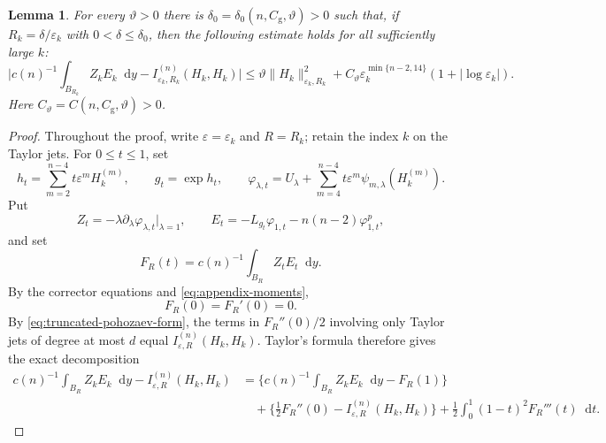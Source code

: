 \documentclass[11pt]{article}
\numberwithin{equation}{section}
\newtheorem{lemma}[theorem]{Lemma}
\theoremstyle{remark}
\newcommand{\dd}{\mathop{}\!\mathrm{d}}
\begin{document}
 \begin{lemma}\label{lem:actual-finite-comparison}
For every $\vartheta>0$ there is
$\delta_0=\delta_0(n,C_{\mathrm g},\vartheta)>0$ such that,
if $R_k=\delta/\varepsilon_k$ with
$0<\delta\le\delta_0$, then the following estimate holds for all
sufficiently large $k$:
\[
 \Bigg|c(n)^{-1}\int_{B_{R_k}}Z_kE_k\dd y
 -I_{\varepsilon_k,R_k}^{(n)}(H_k,H_k)\Bigg|
 \le\vartheta\|H_k\|_{\varepsilon_k,R_k}^2
 +C_\vartheta\varepsilon_k^{\min\{n-2,14\}}
 (1+|\log\varepsilon_k|).
\]
Here $C_\vartheta=C(n,C_{\mathrm g},\vartheta)>0$.
\end{lemma}

\begin{proof}
Throughout the proof, write $\varepsilon=\varepsilon_k$ and $R=R_k$;
retain the index $k$ on the Taylor jets.  For $0\le t\le1$, set
{
\begin{equation*}
 h_t=\sum_{m=2}^{n-4}t\varepsilon^mH_k^{(m)},
 \qquad g_t=\exp h_t,
 \qquad
 \varphi_{\lambda,t}
 =U_\lambda+\sum_{m=4}^{n-4}
 t\varepsilon^m\psi_{m,\lambda}(H_k^{(m)}).
\end{equation*}
}
Put
{
\begin{equation*}
 Z_t=-\lambda\partial_\lambda
       \varphi_{\lambda,t}\big|_{\lambda=1},
 \qquad
 E_t=-L_{g_t}\varphi_{1,t}-n(n-2)\varphi_{1,t}^{p},
\end{equation*}
}
and set
{
\begin{equation*}
 F_R(t)=c(n)^{-1}\int_{B_R}Z_tE_t\dd y.
\end{equation*}
}
By the corrector equations and \eqref{eq:appendix-moments},
{
\begin{equation*}
 F_R(0)=F_R'(0)=0.
\end{equation*}
}
By \eqref{eq:truncated-pohozaev-form}, the terms
in $F_R''(0)/2$ involving only Taylor jets of degree at most
$d$ equal
$I_{\varepsilon,R}^{(n)}(H_k,H_k)$.  Taylor's formula therefore gives
the exact decomposition
{
\begin{equation}\label{eq:actual-formal-exact-decomposition}
\begin{aligned}
 c(n)^{-1}\int_{B_R}Z_kE_k\dd y-I_{\varepsilon,R}^{(n)}(H_k,H_k)
 &=\Biggl\{c(n)^{-1}\int_{B_R}Z_kE_k\dd y-F_R(1)\Biggr\}\\
 &\quad+\Biggl\{\frac12F_R''(0)
             -I_{\varepsilon,R}^{(n)}(H_k,H_k)\Biggr\}
 +\frac12\int_0^1(1-t)^2F_R'''(t)\dd t.
\end{aligned}
\end{equation}
}


\end{proof}
\end{document}
